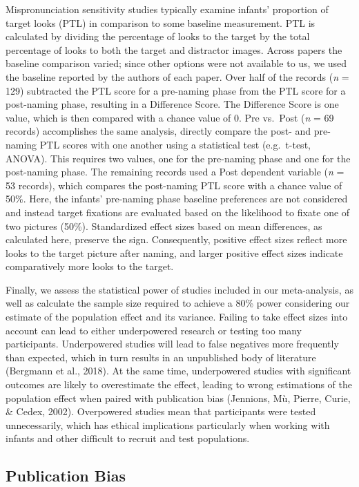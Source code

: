 \documentclass[
  english,
  man, noextraspace]{apa6}
\begin{document}
Mispronunciation sensitivity studies typically examine infants' proportion of target looks (PTL) in comparison to some baseline measurement. PTL is calculated by dividing the percentage of looks to the target by the total percentage of looks to both the target and distractor images. Across papers the baseline comparison varied; since other options were not available to us, we used the baseline reported by the authors of each paper. Over half of the records (\emph{n} = 129) subtracted the PTL score for a pre-naming phase from the PTL score for a post-naming phase, resulting in a Difference Score. The Difference Score is one value, which is then compared with a chance value of 0. Pre vs.~Post (\emph{n} = 69 records) accomplishes the same analysis, directly compare the post- and pre-naming PTL scores with one another using a statistical test (e.g.~t-test, ANOVA). This requires two values, one for the pre-naming phase and one for the post-naming phase. The remaining records used a Post dependent variable (\emph{n} = 53 records), which compares the post-naming PTL score with a chance value of 50\%. Here, the infants' pre-naming phase baseline preferences are not considered and instead target fixations are evaluated based on the likelihood to fixate one of two pictures (50\%). Standardized effect sizes based on mean differences, as calculated here, preserve the sign. Consequently, positive effect sizes reflect more looks to the target picture after naming, and larger positive effect sizes indicate comparatively more looks to the target.

Finally, we assess the statistical power of studies included in our meta-analysis, as well as calculate the sample size required to achieve a 80\% power considering our estimate of the population effect and its variance. Failing to take effect sizes into account can lead to either underpowered research or testing too many participants. Underpowered studies will lead to false negatives more frequently than expected, which in turn results in an unpublished body of literature (Bergmann et al., 2018). At the same time, underpowered studies with significant outcomes are likely to overestimate the effect, leading to wrong estimations of the population effect when paired with publication bias (Jennions, Mù, Pierre, Curie, \& Cedex, 2002). Overpowered studies mean that participants were tested unnecessarily, which has ethical implications particularly when working with infants and other difficult to recruit and test populations.

\hypertarget{publication-bias}{%
\subsection{Publication Bias}\label{publication-bias}}
\end{document}
